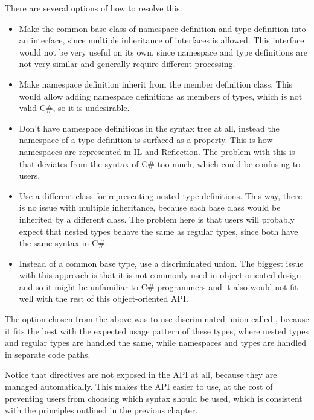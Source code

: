 There are several options of how to resolve this:

\begin{itemize}
\item Make the common base class of namespace definition and type definition into an interface, since multiple inheritance of interfaces is allowed. This interface would not be very useful on its own, since namespace and type definitions are not very similar and generally require different processing.
\item Make namespace definition inherit from the member definition class. This would allow adding namespace definitions as members of types, which is not valid C\#, so it is undesirable.
\item Don't have namespace definitions in the syntax tree at all, instead the namespace of a type definition is surfaced as a property. This is how namespaces are represented in \ac{IL} and Reflection. The problem with this is that deviates from the syntax of C\# too much, which could be confusing to users.
\item Use a different class for representing nested type definitions. This way, there is no issue with multiple inheritance, because each base class would be inherited by a different class. The problem here is that users will probably expect that nested types behave the same as regular types, since both have the same syntax in C\#.
\item Instead of a common base type, use a discriminated union. The biggest issue with this approach is that it is not commonly used in object-oriented design and so it might be unfamiliar to C\# programmers and it also would not fit well with the rest of this object-oriented \ac{API}.
\end{itemize}

The option chosen from the above was to use discriminated union  called , because it fits the best with the expected usage pattern of these types, where nested types and regular types are handled the same, while namespaces and types are handled in separate code paths.

\medskip

Notice that  directives are not exposed in the \ac{API} at all, because they are managed automatically. This makes the \ac{API} easier to use, at the cost of preventing users from choosing which syntax should be used, which is consistent with the principles outlined in the previous chapter.

